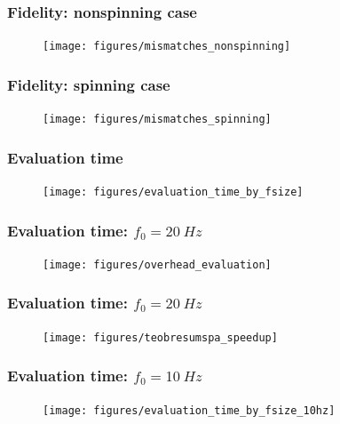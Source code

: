 \documentclass{beamer}
\begin{document}
\begin{frame}
    \frametitle{Fidelity: nonspinning case}
    \begin{figure}[ht]
    \centering
    \texttt{[image: figures/mismatches\_nonspinning]}
    \label{fig:mismatches_nonspinning}
    \end{figure}
\end{frame}

\begin{frame}
    \frametitle{Fidelity: spinning case}
    \begin{figure}[ht]
    \centering
    \texttt{[image: figures/mismatches\_spinning]}
    \end{figure}
\end{frame}

\begin{frame}
    \frametitle{Evaluation time}
    
    \begin{figure}[ht]
    \centering
    \texttt{[image: figures/evaluation\_time\_by\_fsize]}
    \label{fig:evaluation_time_by_fsize}
    \end{figure}
\end{frame}

\begin{frame}
    \frametitle{Evaluation time: \(f_0 = \SI{20}{Hz}\)}
    
    \begin{figure}[ht]
    \centering
    \texttt{[image: figures/overhead\_evaluation]}
    \label{fig:overhead_evaluation}
    \end{figure}
\end{frame}

\begin{frame}
    \frametitle{Evaluation time: \(f_0 = \SI{20}{Hz}\)}
    
    \begin{figure}[ht]
    \centering
    \texttt{[image: figures/teobresumspa\_speedup]}
    \label{fig:teobresumspa_speedup}
    \end{figure}
\end{frame}

\begin{frame}
    \frametitle{Evaluation time: \(f_0 = \SI{10}{Hz}\)}    
    \begin{figure}[ht]
    \centering
    \texttt{[image: figures/evaluation\_time\_by\_fsize\_10hz]}
    \label{fig:evaluation_time_by_fsize}
    \end{figure}
\end{frame}
\end{document}
